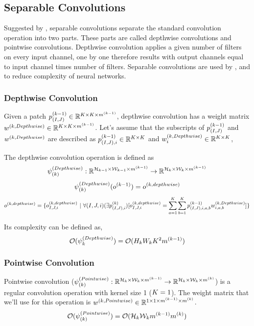 \subsection{Separable Convolutions}
Suggested by \cite{sifre2014rigid}, separable convolutions separate the standard convolution operation into two parts. These parts are called depthwise convolutions and pointwise convolutions. Depthwise convolution applies a given number of filters on every input channel, one by one therefore results with output channels equal to input channel times number of filters. Separable convolutions are used by \cite{chollet2016xception}, \cite{howard2017mobilenets} and \cite{howard2017mobilenets} to reduce complexity of neural networks.
\subsubsection{Depthwise Convolution}

Given a patch $ p^{(k-1)}_{(I,J)} \in \mathbb{R}^{K \times K \times m^{(k-1)}}$, depthwise convolution has a weight matrix $w^{(k, Depthwise)} \in \mathbb{R}^{K \times K \times m^{(k-1)}}$. Let's assume that the subscripts of $p^{(k-1)}_{(I,J)}$ and $w^{(k, Depthwise)}$ are described as $p^{(k-1)}_{(I,J),i} \in \mathbb{R}^{K \times K}$ and $w^{(k, Depthwise)}_{i} \in \mathbb{R}^{K \times K}$,

The depthwise convolution operation is defined as
$$ \psi_{(k)}^{(Depthwise)} : \mathbb{R}^{\mathcal{H}_{k-1} \times \mathcal{W}_{k-1} \times m^{(k-1)}} \rightarrow \mathbb{R}^{\mathcal{H}_{k} \times \mathcal{W}_{k} \times m^{(k-1)}} $$ 
$$\psi_{(k)}^{(Depthwise)}(o^{(k-1)}) = o^{(k, depthwise)} $$
$$ o^{(k, depthwise)} = \{ o^{(k, depthwise)}_{I,J,i} \ | \ \forall (I,J,i) (\exists p^{(k)}_{(I,J),i}) [o^{(k, depthwise)}_{I,J,i} = \sum_{a=1}^K\sum_{b=1}^Kp^{(k-1)}_{(I,J),i,a,b} w^{(k, Depthwise)}_{i,a,b} ] \} $$  %

Its complexity can be defined as, 
$$ \mathcal{O} (\psi_k^{(Depthwise)}) = \mathcal{O} (H_kW_kK^2m^{(k-1)}) $$

\subsubsection{Pointwise Convolution}
Pointwise convolution ($\psi_{(k)}^{(Pointwise)} : \mathbb{R}^{\mathcal{H}_{k} \times \mathcal{W}_{k} \times m^{(k-1)}} \rightarrow \mathbb{R}^{\mathcal{H}_{k} \times \mathcal{W}_{k} \times m^{(k)}}$) is a regular convolution operation with kernel size 1 ($K = 1$). The weight matrix that we'll use for this operation is $w^{(k, Pointwise)} \in \mathbb{R}^{ 1 \times 1 \times m^{(k-1)} \times m^{(k)}}$. 
$$ \mathcal{O}(\psi_{(k)}^{(Pointwise)}) = \mathcal{O}( \mathcal{H}_{k}\mathcal{W}_{k}m^{(k-1)}m^{(k)})$$


